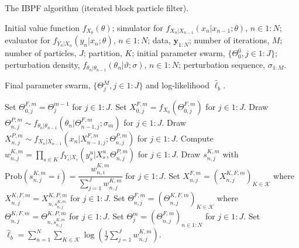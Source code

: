 \documentclass{article}
\begin{document}
\begin{algorithm}[H]
\caption{The IBPF algorithm (iterated block particle filter).}
\begin{algorithmic}[1]
\REQUIRE Initial value function $f_{X_0}(\theta)$; 
simulator for $f_{X_n|X_{n-1}}(x_n | x_{n-1}; \theta)$, $n \in 1:N$; 
evaluator for $f_{Y_n|X_n}(y_n | x_n; \theta)$, $n \in 1:N$; 
data, $\mathbf{y}_{1:N}$; 
number of iterations, $M$; 
number of particles, $J$; 
partition, $K$; 
initial parameter swarm, $\{\Theta_0^0, j \in 1:J\}$; 
perturbation density, $f_{\theta_n|\theta_{n-1}}(\theta_n | \vartheta; \sigma)$, $n \in 1:N$; 
perturbation sequence, $\sigma_{1:M}$.

\ENSURE Final parameter swarm, $\{\Theta_j^M, j \in 1:J\}$ and log-likelihood $\hat{\ell}_b$.

    \STATE Set $\Theta_{0,j}^{F,m} = \Theta_{j}^{m-1}$ for $j \in 1:J$.
    \STATE Set $X_{0,j}^{F,m} = f_{X_0}(\Theta_{0,j}^{F,m})$ for $j \in 1:J$.
        \STATE Draw $\Theta_{n,j}^{P,m} \sim f_{\theta_n|\theta_{n-1}}(\theta_n | \Theta_{n-1,j}^{F,m}; \sigma_m)$ for $j \in 1:J$.
        \STATE Draw $X_{n,j}^{P,m} \sim f_{X_n|X_{n-1}}(x_n | X_{n-1,j}^{F,m}; \Theta_{n,j}^{P,m})$ for $j \in 1:J$.
            \STATE Compute $w_{n,j}^{K,m} = \prod_{s \in K} f_{Y_s|X_s}(y_s^u | X_s^u, \Theta_{n,j}^{P,m})$ for $j \in 1:J$.
            \STATE Draw $s_{n,j}^{K,m}$ with $\mathrm{Prob}(s_{n,j}^{K,m} = i) = \dfrac{w_{n,i}^{K,m}}{\sum_{j=1}^J w_{n,j}^{K,m}}$ for $j \in 1:J$.
        \ENDFOR
        \STATE Set $X_{n,j}^{F,m} = (X_{n,j}^{K,F,m})_{K \in \mathcal{K}}$ where $X_{n,j}^{K,F,m} = X_{n,s_{n,j}^{K,m}}^{K,P,m}$ for $j \in 1:J$.
        \STATE Set $\Theta_{n,j}^{F,m} = (\Theta_{n,j}^{K,F,m})_{K \in \mathcal{K}}$ where $\Theta_{n,j}^{K,F,m} = \Theta_{n,s_{n,j}^{K,m}}^{K,P,m}$ for $j \in 1:J$.
    \ENDFOR
    \STATE Set $\Theta_{j}^{m} = (\Theta_{n,j}^{F,m})_{n \in 1:N}$ for $j \in 1:J$.
\ENDFOR
\STATE Set $\hat{\ell}_b = \sum_{n=1}^N \sum_{K \in \mathcal{K}} \log \left( \frac{1}{J} \sum_{j=1}^J w_{n,j}^{K,m} \right)$.
\end{algorithmic}
\end{algorithm}
\end{document}
